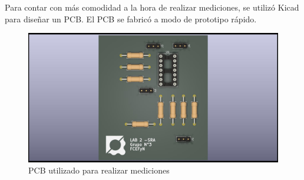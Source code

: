 \documentclass{article}
\begin{document}
Para contar con más comodidad a la hora de realizar mediciones, se utilizó Kicad para diseñar un PCB. El PCB se fabricó a modo de prototipo rápido.

\begin{figure}[H]
    \centering
    \includegraphics[width=1\linewidth]{LABN2_SRA.jpg}
    \caption{PCB utilizado para realizar mediciones}
    \label{fig:enter-label}
\end{figure}



\newpage


\newpage


\newpage
 
\end{document}
